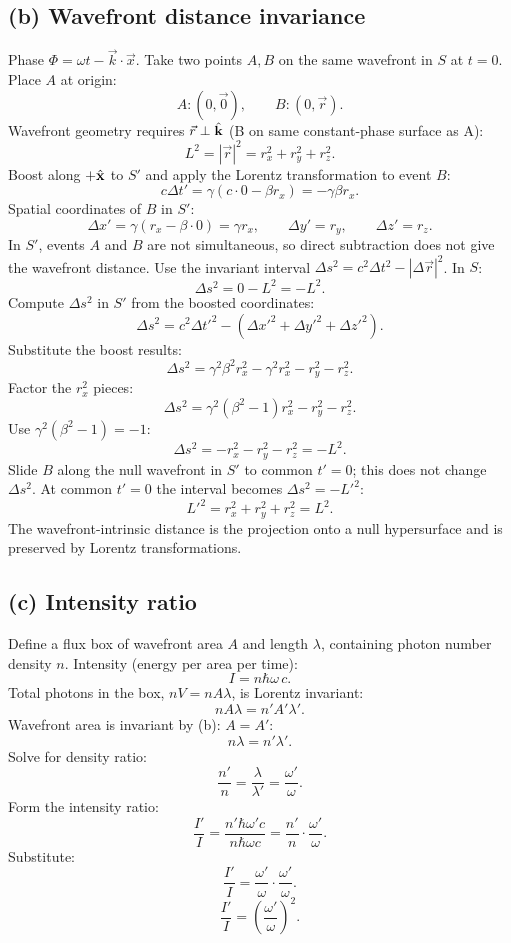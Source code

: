 \documentclass[11pt]{article}
\begin{document}
\subsection*{(b) Wavefront distance invariance}

Phase $\Phi=\omega t-\vec k\cdot\vec x$. Take two points $A,B$ on the same wavefront in $S$ at $t=0$. Place $A$ at origin:
\[ A:(0,\vec 0),\qquad B:(0,\vec r). \]
Wavefront geometry requires $\vec r\perp\hat{\vb k}$ (B on same constant-phase surface as A):
\[ L^2=|\vec r|^2=r_x^2+r_y^2+r_z^2. \]
Boost along $+\hat{\vb x}$ to $S'$ and apply the Lorentz transformation to event $B$:
\[ c\Delta t'=\gamma(c\cdot 0-\beta r_x)=-\gamma\beta r_x. \]
Spatial coordinates of $B$ in $S'$:
\[ \Delta x'=\gamma(r_x-\beta\cdot 0)=\gamma r_x,\qquad \Delta y'=r_y,\qquad \Delta z'=r_z. \]
In $S'$, events $A$ and $B$ are not simultaneous, so direct subtraction does not give the wavefront distance. Use the invariant interval $\Delta s^2=c^2\Delta t^2-|\Delta\vec r|^2$. In $S$:
\[ \Delta s^2=0-L^2=-L^2. \]
Compute $\Delta s^2$ in $S'$ from the boosted coordinates:
\[ \Delta s^2=c^2\Delta t'^2-(\Delta x'^2+\Delta y'^2+\Delta z'^2). \]
Substitute the boost results:
\[ \Delta s^2=\gamma^2\beta^2 r_x^2-\gamma^2 r_x^2-r_y^2-r_z^2. \]
Factor the $r_x^2$ pieces:
\[ \Delta s^2=\gamma^2(\beta^2-1)r_x^2-r_y^2-r_z^2. \]
Use $\gamma^2(\beta^2-1)=-1$:
\[ \Delta s^2=-r_x^2-r_y^2-r_z^2=-L^2. \]
Slide $B$ along the null wavefront in $S'$ to common $t'=0$; this does not change $\Delta s^2$. At common $t'=0$ the interval becomes $\Delta s^2=-L'^2$:
\begin{equation}
\boxed{\,L'^2=r_x^2+r_y^2+r_z^2=L^2.\,}
\end{equation}
The wavefront-intrinsic distance is the projection onto a null hypersurface and is preserved by Lorentz transformations.

\subsection*{(c) Intensity ratio}

Define a flux box of wavefront area $A$ and length $\lambda$, containing photon number density $n$. Intensity (energy per area per time):
\[ I=n\hbar\omega\,c. \]
Total photons in the box, $nV=nA\lambda$, is Lorentz invariant:
\[ nA\lambda=n'A'\lambda'. \]
Wavefront area is invariant by (b): $A=A'$:
\[ n\lambda=n'\lambda'. \]
Solve for density ratio:
\[ \frac{n'}{n}=\frac{\lambda}{\lambda'}=\frac{\omega'}{\omega}. \]
Form the intensity ratio:
\[ \frac{I'}{I}=\frac{n'\hbar\omega' c}{n\hbar\omega c}=\frac{n'}{n}\cdot\frac{\omega'}{\omega}. \]
Substitute:
\[ \frac{I'}{I}=\frac{\omega'}{\omega}\cdot\frac{\omega'}{\omega}. \]
\begin{equation}
\boxed{\,\frac{I'}{I}=\left(\frac{\omega'}{\omega}\right)^{\!2}.\,}
\end{equation}
\end{document}
